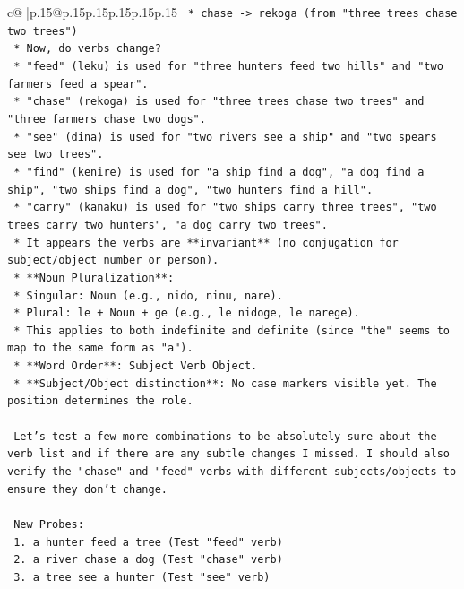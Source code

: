 \documentclass{article}
\begin{document}
{\begin{supertabular}{c@{$\;$}|p{.15\linewidth}@{}p{.15\linewidth}p{.15\linewidth}p{.15\linewidth}p{.15\linewidth}p{.15\linewidth}}
{{{\texttt{        *   chase {-}> rekoga (from "three trees chase two trees")} \\
\texttt{    *   Now, do verbs change?} \\
\texttt{        *   "feed" (leku) is used for "three hunters feed two hills" and "two farmers feed a spear".} \\
\texttt{        *   "chase" (rekoga) is used for "three trees chase two trees" and "three farmers chase two dogs".} \\
\texttt{        *   "see" (dina) is used for "two rivers see a ship" and "two spears see two trees".} \\
\texttt{        *   "find" (kenire) is used for "a ship find a dog", "a dog find a ship", "two ships find a dog", "two hunters find a hill".} \\
\texttt{        *   "carry" (kanaku) is used for "two ships carry three trees", "two trees carry two hunters", "a dog carry two trees".} \\
\texttt{    *   It appears the verbs are **invariant** (no conjugation for subject/object number or person).} \\
\texttt{    *   **Noun Pluralization**:} \\
\texttt{        *   Singular: Noun (e.g., nido, ninu, nare).} \\
\texttt{        *   Plural: le + Noun + ge (e.g., le nidoge, le narege).} \\
\texttt{        *   This applies to both indefinite and definite (since "the" seems to map to the same form as "a").} \\
\texttt{    *   **Word Order**: Subject Verb Object.} \\
\texttt{    *   **Subject/Object distinction**: No case markers visible yet. The position determines the role.} \\
\\ 
\texttt{    Let's test a few more combinations to be absolutely sure about the verb list and if there are any subtle changes I missed. I should also verify the "chase" and "feed" verbs with different subjects/objects to ensure they don't change.} \\
\\ 
\texttt{    New Probes:} \\
\texttt{    1.  a hunter feed a tree (Test "feed" verb)} \\
\texttt{    2.  a river chase a dog (Test "chase" verb)} \\
\texttt{    3.  a tree see a hunter (Test "see" verb)} \\
}}}
\end{supertabular}}
\end{document}
